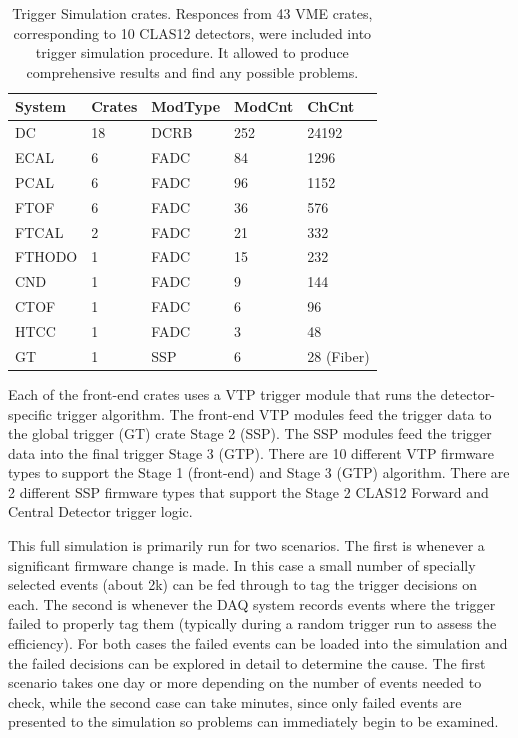 \begin{table}
\begin{center}
	\begin{tabular}{| l | l | l | l | l |}
		\hline \hline
		System		& Crates	& ModType	& ModCnt	& ChCnt		\\
		\hline
		DC			& 18		& DCRB		& 252		& 24192		\\
		ECAL		& 6			& FADC		& 84		& 1296	 	\\
		PCAL		& 6			& FADC		& 96		& 1152	 	\\
		FTOF		& 6			& FADC		& 36		& 576	 	\\
		FTCAL		& 2			& FADC		& 21		& 332	 	\\
		FTHODO		& 1			& FADC		& 15		& 232	 	\\
		CND			& 1			& FADC		& 9			& 144	 	\\
		CTOF		& 1			& FADC		& 6			& 96	 	\\
		HTCC		& 1			& FADC		& 3			& 48	 	\\
		GT			& 1			& SSP		& 6			& 28 (Fiber)	\\
		\hline \hline
	\end{tabular}
\end{center}
\caption{Trigger Simulation crates. Responces from 43 VME crates, corresponding to 10 CLAS12 detectors, were included into trigger simulation procedure. It allowed to produce comprehensive results and find any possible problems.}
\label{tab:trig_sim_crates}
\end{table}

Each of the front-end crates uses a VTP trigger module that runs the detector-specific trigger algorithm. The front-end VTP modules feed the trigger data to the global trigger (GT) crate Stage 2 (SSP). The SSP modules feed the trigger data into the final trigger Stage 3 (GTP). There are 10 different VTP firmware types to support the Stage 1 (front-end) and Stage 3 (GTP) algorithm. There are 2 different SSP firmware types that support the Stage 2 CLAS12 Forward and Central Detector trigger logic.

This full simulation is primarily run for two scenarios. The first is whenever a significant firmware change is made. In this case a small number of specially selected events (about 2k) can be fed through to tag the trigger decisions on each. The second is whenever the DAQ system records events where the trigger failed to properly tag them (typically during a random trigger run to assess the efficiency). For both cases the failed events can be loaded into the simulation and the failed decisions can be explored in detail to determine the cause. The first scenario takes one day or more depending on the number of events needed to check, while the second case can take minutes, since only failed events are presented to the simulation so problems can immediately begin to be examined.